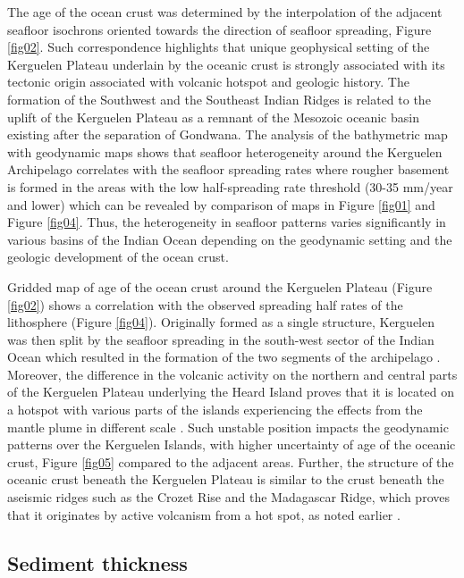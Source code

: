 \documentclass[geomatics,article,submit,pdftex,moreauthors]{Definitions/mdpi}
\begin{document}
The age of the ocean crust was determined by the interpolation of the adjacent seafloor isochrons oriented towards the direction of seafloor spreading, Figure \ref{fig02}. Such correspondence highlights that unique geophysical setting of the Kerguelen Plateau underlain by the oceanic crust is strongly associated with its tectonic origin associated with volcanic hotspot and geologic history. The formation of the Southwest and the Southeast Indian Ridges is related to the uplift of the Kerguelen Plateau as a remnant of the Mesozoic oceanic basin existing after the separation of Gondwana. The analysis of the bathymetric map with geodynamic maps shows that seafloor heterogeneity around the Kerguelen Archipelago correlates with the seafloor spreading rates where rougher basement is formed in the areas with the low half-spreading rate threshold (30-35 mm/year and lower) which can be revealed by comparison of maps in Figure \ref{fig01} and Figure \ref{fig04}. Thus, the heterogeneity in seafloor patterns varies significantly in various basins of the Indian Ocean depending on the geodynamic setting and the geologic development of the ocean crust.

Gridded map of age of the ocean crust around the Kerguelen Plateau (Figure \ref{fig02}) shows a correlation with the observed spreading half rates of the lithosphere (Figure \ref{fig04}). Originally formed as a single structure, Kerguelen was then split by the seafloor spreading in the south-west sector of the Indian Ocean which resulted in the formation of the two segments of the archipelago \cite{BRADLEY1988243}. Moreover, the difference in the volcanic activity on the northern and central parts of the Kerguelen Plateau underlying the Heard Island proves that it is located on a hotspot with various parts of the islands experiencing the effects from the mantle plume in different scale \cite{Duncan2016,Plenier,HOUTZ197795}. Such unstable position impacts the geodynamic patterns over the Kerguelen Islands, with higher uncertainty of age of the oceanic crust, Figure \ref{fig05} compared to the adjacent areas. Further, the structure of the oceanic crust beneath the Kerguelen Plateau is similar to the crust beneath the aseismic ridges such as the Crozet Rise and the Madagascar Ridge, which proves that it originates by active volcanism from a hot spot, as noted earlier \cite{Recq}.

\subsection{Sediment thickness}
\end{document}
